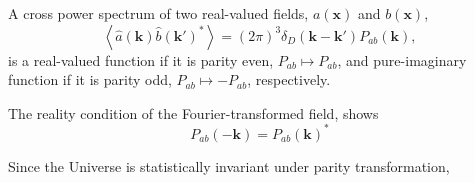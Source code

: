 \documentclass[a4paper,11pt, fleqn]{article}
\begin{document}
A cross power spectrum of two real-valued fields,
$a(\bm{x})$ and $b(\bm{x})$,
%
\begin{equation}
  \left\langle \hat{a}(\bm{k}) \hat{b}(\bm{k}')^* \right\rangle
  = (2\pi)^3 \delta_D(\bm{k} - \bm{k}') P_{ab}(\bm{k}),
\end{equation}
%
is a real-valued function if it is parity even, $P_{ab} \mapsto P_{ab}$, and
pure-imaginary function if it is parity odd, $P_{ab} \mapsto -P_{ab}$, respectively.

The reality condition of the Fourier-transformed field,
shows
\begin{equation}
  P_{ab}(-\bm{k}) = P_{ab}(\bm{k})^*
\end{equation}

  
Since the Universe is statistically invariant under parity transformation,
\end{document}
